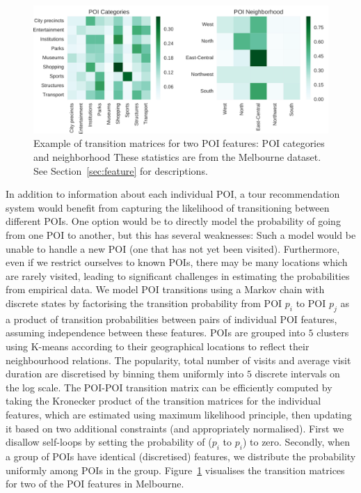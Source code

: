 

\begin{figure}[t]
\includegraphics[width=\columnwidth]{fig/poi_transmat.png}
\caption{Example of transition matrices for two POI features: POI categories and neighborhood
These statistics are from the Melbourne dataset. See Section~\ref{sec:feature} for descriptions.}
\label{fig:transmat}
\end{figure}


In addition to information about each individual POI, a tour recommendation system would benefit
from capturing the likelihood of transitioning between different POIs. One option would be to
directly model the probability of going from one POI to another, but this has several weaknesses:
Such a model would be unable to handle a new POI (one that has not yet been visited).
Furthermore, even if we restrict ourselves to known POIs, there may be many locations which
are rarely visited, leading to significant challenges in estimating the probabilities from
empirical data.
%
We model POI transitions using a Markov chain with discrete %
states by factorising the transition probability from POI $p_i$ to POI $p_j$ 
as a product of transition probabilities between pairs of individual POI features, %
assuming independence between these features.
POIs are grouped into $5$ clusters using K-means according to their geographical locations to reflect their neighbourhood relations.
The popularity, total number of visits and average visit duration are discretised by binning
them uniformly into $5$ discrete intervals on the log scale.
The POI-POI transition matrix can be efficiently computed by taking the Kronecker product of
the transition matrices for the individual features, which are estimated using maximum likelihood principle, 
then updating it based on two additional constraints (and appropriately normalised).
First we disallow self-loops by setting the probability of ($p_i$ to $p_i$) to zero.
Secondly, when a group of POIs have identical (discretised) features, we distribute the probability uniformly among POIs in the group. 
Figure~\ref{fig:transmat} visualises the transition matrices for two of the POI features in Melbourne.
